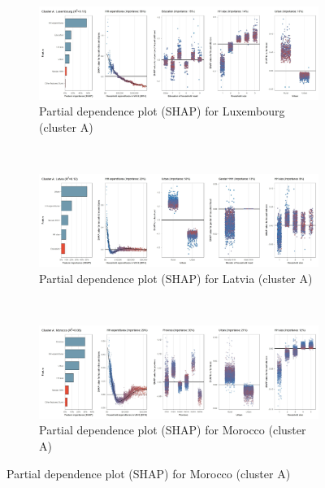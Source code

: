 \begin{figure}[ht!]\ContinuedFloat
    \centering
   \begin{subfigure}[b]{\textwidth}
         \centering
         \caption{Partial dependence plot (SHAP) for Luxembourg (cluster A)}
         \label{fig:5b_LUX}
         \includegraphics[width=\textwidth]{Figure 5b/Figure_5b_LUX}
         \end{subfigure}
    \\
    \vspace{0.5cm}
   \begin{subfigure}[b]{\textwidth}
   \centering
         \caption{Partial dependence plot (SHAP) for Latvia (cluster A)}
         \label{fig:5b_LVA}
         \includegraphics[width=\textwidth]{Figure 5b/Figure_5b_LVA}
         \end{subfigure}
    \\
    \vspace{0.5cm}
   \begin{subfigure}[b]{\textwidth}
    \centering
         \caption{Partial dependence plot (SHAP) for Morocco (cluster A)}
         \label{fig:5b_MAR}
         \includegraphics[width=\textwidth]{Figure 5b/Figure_5b_MAR}     

\end{subfigure}
\end{figure}
